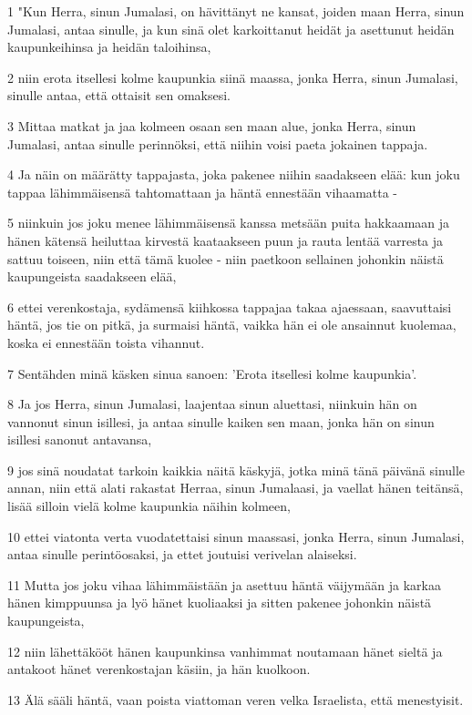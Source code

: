 \par 1 "Kun Herra, sinun Jumalasi, on hävittänyt ne kansat, joiden maan Herra, sinun Jumalasi, antaa sinulle, ja kun sinä olet karkoittanut heidät ja asettunut heidän kaupunkeihinsa ja heidän taloihinsa,
\par 2 niin erota itsellesi kolme kaupunkia siinä maassa, jonka Herra, sinun Jumalasi, sinulle antaa, että ottaisit sen omaksesi.
\par 3 Mittaa matkat ja jaa kolmeen osaan sen maan alue, jonka Herra, sinun Jumalasi, antaa sinulle perinnöksi, että niihin voisi paeta jokainen tappaja.
\par 4 Ja näin on määrätty tappajasta, joka pakenee niihin saadakseen elää: kun joku tappaa lähimmäisensä tahtomattaan ja häntä ennestään vihaamatta -
\par 5 niinkuin jos joku menee lähimmäisensä kanssa metsään puita hakkaamaan ja hänen kätensä heiluttaa kirvestä kaataakseen puun ja rauta lentää varresta ja sattuu toiseen, niin että tämä kuolee - niin paetkoon sellainen johonkin näistä kaupungeista saadakseen elää,
\par 6 ettei verenkostaja, sydämensä kiihkossa tappajaa takaa ajaessaan, saavuttaisi häntä, jos tie on pitkä, ja surmaisi häntä, vaikka hän ei ole ansainnut kuolemaa, koska ei ennestään toista vihannut.
\par 7 Sentähden minä käsken sinua sanoen: 'Erota itsellesi kolme kaupunkia'.
\par 8 Ja jos Herra, sinun Jumalasi, laajentaa sinun aluettasi, niinkuin hän on vannonut sinun isillesi, ja antaa sinulle kaiken sen maan, jonka hän on sinun isillesi sanonut antavansa,
\par 9 jos sinä noudatat tarkoin kaikkia näitä käskyjä, jotka minä tänä päivänä sinulle annan, niin että alati rakastat Herraa, sinun Jumalaasi, ja vaellat hänen teitänsä, lisää silloin vielä kolme kaupunkia näihin kolmeen,
\par 10 ettei viatonta verta vuodatettaisi sinun maassasi, jonka Herra, sinun Jumalasi, antaa sinulle perintöosaksi, ja ettet joutuisi verivelan alaiseksi.
\par 11 Mutta jos joku vihaa lähimmäistään ja asettuu häntä väijymään ja karkaa hänen kimppuunsa ja lyö hänet kuoliaaksi ja sitten pakenee johonkin näistä kaupungeista,
\par 12 niin lähettäkööt hänen kaupunkinsa vanhimmat noutamaan hänet sieltä ja antakoot hänet verenkostajan käsiin, ja hän kuolkoon.
\par 13 Älä sääli häntä, vaan poista viattoman veren velka Israelista, että menestyisit.
